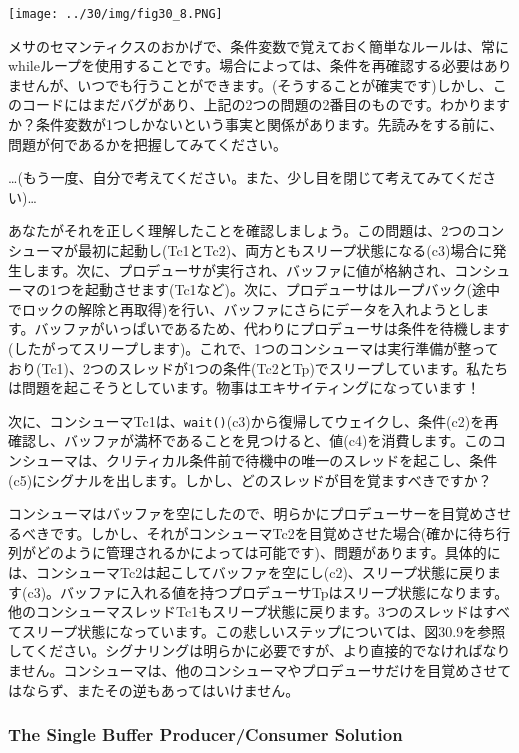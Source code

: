 \texttt{[image: ../30/img/fig30\_8.PNG]}

メサのセマンティクスのおかげで、条件変数で覚えておく簡単なルールは、常にwhileループを使用することです。場合によっては、条件を再確認する必要はありませんが、いつでも行うことができます。(そうすることが確実です)しかし、このコードにはまだバグがあり、上記の2つの問題の2番目のものです。わかりますか？条件変数が1つしかないという事実と関係があります。先読みをする前に、問題が何であるかを把握してみてください。

\ldots(もう一度、自分で考えてください。また、少し目を閉じて考えてみてください)\ldots{}

あなたがそれを正しく理解したことを確認しましょう。この問題は、2つのコンシューマが最初に起動し(Tc1とTc2)、両方ともスリープ状態になる(c3)場合に発生します。次に、プロデューサが実行され、バッファに値が格納され、コンシューマの1つを起動させます(Tc1など)。次に、プロデューサはループバック(途中でロックの解除と再取得)を行い、バッファにさらにデータを入れようとします。バッファがいっぱいであるため、代わりにプロデューサは条件を待機します(したがってスリープします)。これで、1つのコンシューマは実行準備が整っており(Tc1)、2つのスレッドが1つの条件(Tc2とTp)でスリープしています。私たちは問題を起こそうとしています。物事はエキサイティングになっています！

次に、コンシューマTc1は、\texttt{wait()}(c3)から復帰してウェイクし、条件(c2)を再確認し、バッファが満杯であることを見つけると、値(c4)を消費します。このコンシューマは、クリティカル条件前で待機中の唯一のスレッドを起こし、条件(c5)にシグナルを出します。しかし、どのスレッドが目を覚ますべきですか？

コンシューマはバッファを空にしたので、明らかにプロデューサーを目覚めさせるべきです。しかし、それがコンシューマTc2を目覚めさせた場合(確かに待ち行列がどのように管理されるかによっては可能です)、問題があります。具体的には、コンシューマTc2は起こしてバッファを空にし(c2)、スリープ状態に戻ります(c3)。バッファに入れる値を持つプロデューサTpはスリープ状態になります。他のコンシューマスレッドTc1もスリープ状態に戻ります。3つのスレッドはすべてスリープ状態になっています。この悲しいステップについては、図30.9を参照してください。シグナリングは明らかに必要ですが、より直接的でなければなりません。コンシューマは、他のコンシューマやプロデューサだけを目覚めさせてはならず、またその逆もあってはいけません。

\hypertarget{the-single-buffer-producerconsumer-solution}{%
\subsubsection*{The Single Buffer Producer/Consumer
Solution}\label{the-single-buffer-producerconsumer-solution}}

